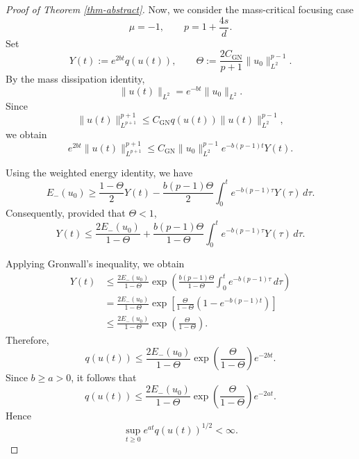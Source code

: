 \documentclass[10pt%
]{amsart}
\numberwithin{equation}{section}
\theoremstyle{definition}
\begin{document}
\begin{proof}[Proof of Theorem \ref{thm-abstract}]
Now, we consider the mass-critical focusing case
\[
\mu=-1,
\qquad
p=1+\frac{4s}{d}.
\]
Set
\[
Y(t):=e^{2b t}q(u(t)),
\qquad
\Theta
:=
\frac{2C_{\mathrm{GN}}}{p+1}
\|u_0\|_{L^2}^{p-1}.
\]
By the mass dissipation identity,
\[
\|u(t)\|_{L^2}
=
e^{-bt}\|u_0\|_{L^2}.
\]
Since
\[
\|u(t)\|_{L^{p+1}}^{p+1}
\le
C_{\mathrm{GN}}
q(u(t))
\|u(t)\|_{L^2}^{p-1},
\]
we obtain
\[
e^{2bt}\|u(t)\|_{L^{p+1}}^{p+1}
\le
C_{\mathrm{GN}}
\|u_0\|_{L^2}^{p-1}
e^{-b(p-1)t}Y(t).
\]

Using the weighted energy identity, we have
\begin{equation}
\label{equ:mass-critical-lower-bound}
E_-(u_0)
\ge
\frac{1-\Theta}{2}Y(t)
-
\frac{b(p-1)\Theta}{2}
\int_0^t
e^{-b(p-1)\tau}Y(\tau)\,d\tau.
\tag{B.13}
\end{equation}
Consequently, provided that $\Theta<1$,
\begin{equation}
\label{equ:mass-critical-gronwall}
Y(t)
\le
\frac{2E_-(u_0)}{1-\Theta}
+
\frac{b(p-1)\Theta}{1-\Theta}
\int_0^t
e^{-b(p-1)\tau}Y(\tau)\,d\tau.
\tag{B.14}
\end{equation}

Applying Gronwall's inequality, we obtain
\[
\begin{aligned}
Y(t)
&\le
\frac{2E_-(u_0)}{1-\Theta}
\exp\left(
\frac{b(p-1)\Theta}{1-\Theta}
\int_0^t e^{-b(p-1)\tau}\,d\tau
\right)
\\
&=
\frac{2E_-(u_0)}{1-\Theta}
\exp\left[
\frac{\Theta}{1-\Theta}
\left(1-e^{-b(p-1)t}\right)
\right]
\\
&\le
\frac{2E_-(u_0)}{1-\Theta}
\exp\left(\frac{\Theta}{1-\Theta}\right).
\end{aligned}
\]
Therefore,
\begin{equation}
\label{equ:mass-critical-decay}
q(u(t))
\le
\frac{2E_-(u_0)}{1-\Theta}
\exp\left(\frac{\Theta}{1-\Theta}\right)e^{-2bt}.
\tag{B.15}
\end{equation}
Since $b\ge a>0$, it follows that
\[
q(u(t))
\le
\frac{2E_-(u_0)}{1-\Theta}
\exp\left(\frac{\Theta}{1-\Theta}\right)e^{-2at}.
\]
Hence
\[
\sup_{t\ge0}e^{at}q(u(t))^{1/2}<\infty.
\]



\end{proof}
\end{document}
